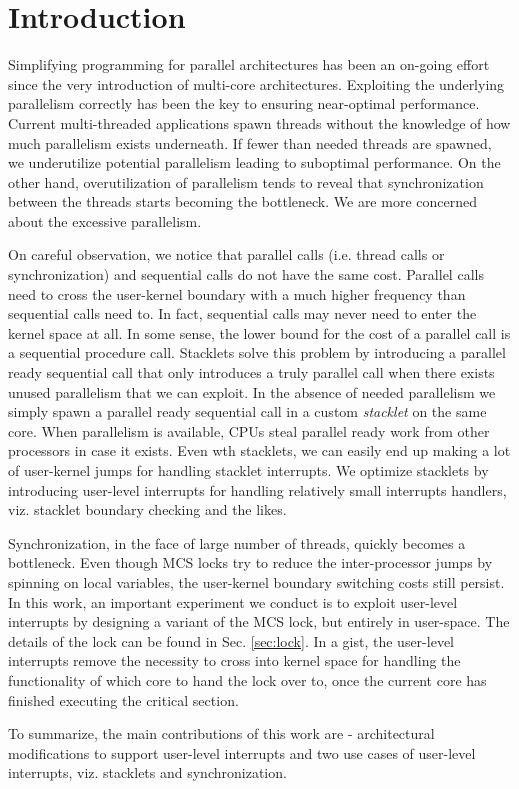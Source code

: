 \section{Introduction}
Simplifying programming for parallel architectures has been an on-going effort
since the very introduction of multi-core architectures. Exploiting the
underlying parallelism correctly has been the key to ensuring near-optimal
performance. Current multi-threaded applications spawn threads without the
knowledge of how much parallelism exists underneath. If fewer than needed
threads are spawned, we underutilize potential parallelism leading to suboptimal
performance. On the other hand, overutilization of parallelism tends to reveal
that synchronization between the threads starts becoming the bottleneck. We are
more concerned about the excessive parallelism.

On careful observation, we notice that parallel calls (i.e. thread calls or
synchronization) and sequential calls do not have the same cost. Parallel calls
need to cross the user-kernel boundary with a much higher frequency than
sequential calls need to. In fact, sequential calls may never need to enter the
kernel space at all. In some sense, the lower bound for the cost of a parallel
call is a sequential procedure call. Stacklets solve this problem by introducing
a parallel ready sequential call that only introduces a truly parallel call when
there exists unused parallelism that we can exploit. In the absence of needed
parallelism we simply spawn a parallel ready sequential call in a custom
\textit{stacklet} on the same core. When parallelism is available, CPUs steal
parallel ready work from other processors in case it exists. Even wth stacklets,
we can easily end up making a lot of user-kernel jumps for handling stacklet
interrupts. We optimize stacklets by introducing user-level interrupts for
handling relatively small interrupts handlers, viz. stacklet boundary checking
and the likes.

Synchronization, in the face of large number of threads, quickly becomes a
bottleneck. Even though MCS locks try to reduce the inter-processor jumps by
spinning on local variables, the user-kernel boundary switching costs still
persist. In this work, an important experiment we conduct is to exploit
user-level interrupts by designing a variant of the MCS lock, but entirely in
user-space. The details of the lock can be found in Sec. \ref{sec:lock}. In a
gist, the user-level interrupts remove the necessity to cross into kernel space
for handling the functionality of which core to hand the lock over to, once the
current core has finished executing the critical section.

To summarize, the main contributions of this work are - architectural
modifications to support user-level interrupts and two use cases of user-level
interrupts, viz. stacklets and synchronization.
